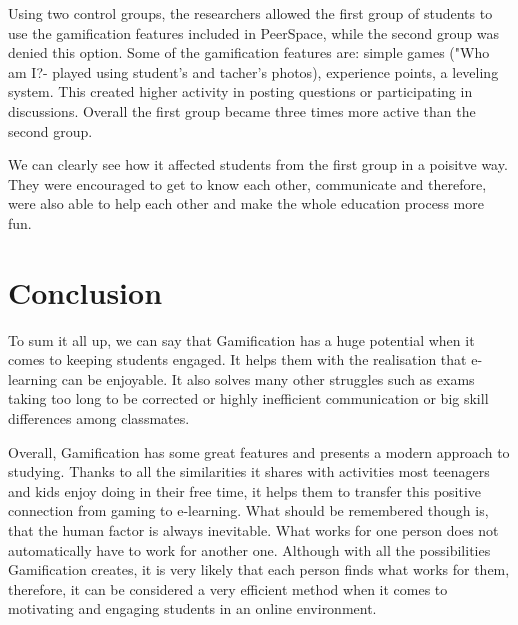 \documentclass[10pt,english,a4paper]{article}
\begin{document}
	Using two control groups, the researchers allowed the first group of students to use the gamification features included in PeerSpace, while the second group was denied this option.
	Some of the gamification features are: simple games ("Who am I?- played using student's and tacher's photos), experience points, a leveling system. 
	This created higher activity in posting questions or participating in discussions. Overall the first group became three times more active than the second group\cite{Li}. 
	
	We can clearly see how it affected students from the first group in a poisitve way. 
	They were encouraged to get to know each other, communicate and therefore, were also able to help each other and make the whole education process more fun.

\section{Conclusion} \label{section5}
	To sum it all up, we can say that Gamification has a huge potential when it comes to keeping students engaged. 
	It helps them with the realisation that e-learning can be enjoyable.
	It also solves many other struggles such as exams taking too long to be corrected or highly inefficient communication or big skill differences among classmates.
	
	Overall, Gamification has some great features and presents a modern approach to studying. 
	Thanks to all the similarities it shares with activities most teenagers and kids enjoy doing in their free time, it helps them to transfer this positive connection from gaming to e-learning. 
	What should be remembered though is, that the human factor is always inevitable. What works for one person does not automatically have to work for another one.
	Although with all the possibilities Gamification creates, it is very likely that each person finds what works for them, therefore, it can be considered a very efficient method when it comes to motivating and engaging students in an online environment.



\end{document}
